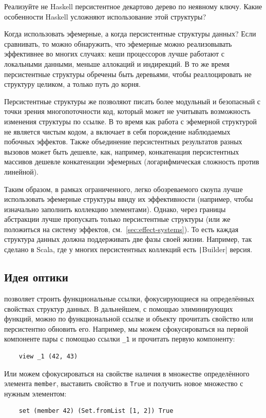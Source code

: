 \begin{task}
    Реализуйте не Haskell персистентное декартово дерево по неявному ключу.
    Какие особенности Haskell усложняют использование этой структуры?
\end{task}

Когда использовать эфемерные, а когда персистентные структуры данных?
Если сравнивать, то можно обнаружить, что эфемерные можно реализовывать эффективнее во многих случаях: кеши процессоров лучше работают с локальными данными, меньше аллокаций и индирекций.
В то же время персистентные структуры обречены быть деревьями, чтобы реаллоцировать не структуру целиком, а только путь до корня.

Персистентные структуры же позволяют писать более модульный и безопасный с точки зрения многопоточности код, который может не учитывать возможность изменения структуры по ссылке.
В то время как работа с эфемерной структурой не является чистым кодом, а включает в себя порождение наблюдаемых побочных эффектов.
Также объединение персистентных результатов разных вызовов может быть дешевле, как, например, конкатенация персистентных массивов дешевле конкатенации эфемерных (логарифмическая сложность против линейной).

Таким образом, в рамках ограниченного, легко обозреваемого скоупа лучше использовать эфемерные структуры ввиду их эффективности (например, чтобы изначально заполнить коллекцию элементами).
Однако, через границы абстракции лучше пропускать только персистентные структуры (или же положиться на систему эффектов, см.~\ref{sec:effect-systems}).
То есть каждая структура данных должна поддерживать две фазы своей жизни.
Например, так сделано в Scala, где у многих персистентных коллекций есть \texttt|Builder| версия.

\subsection{Идея оптики}

 позволяет строить функциональные ссылки, фокусирующиеся на определённых свойствах структур данных.
В дальнейшем, с помощью элиминирующих функций, можно по функциональной ссылке и объекту прочитать свойство или персистентно обновить его.
Например, мы можем сфокусироваться на первой компоненте пары с помощью ссылки \texttt{\_1} и прочитать первую компоненту:
\begin{verbatim}
    view _1 (42, 43)
\end{verbatim}
Или можем сфокусироваться на свойстве наличия в множестве определённого элемента \texttt{member}, выставить свойство в \texttt{True} и получить новое множество с нужным элементом:
\begin{verbatim}
    set (member 42) (Set.fromList [1, 2]) True
\end{verbatim}

